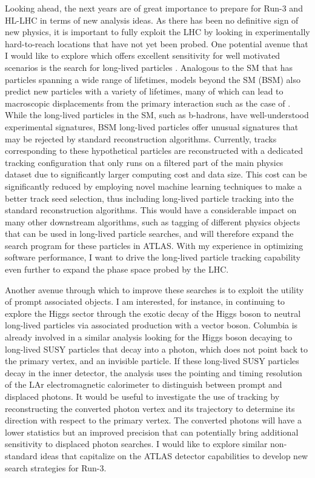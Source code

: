 \documentclass[a4paper]{article}
\begin{document}
\bigskip

Looking ahead, the next years are of great importance to prepare for Run-3 and HL-LHC in terms of new analysis ideas. As there has been no definitive sign of new physics,
it is important to fully exploit the LHC by looking in experimentally hard-to-reach locations that have not yet been probed.
One potential avenue that I would like to explore which offers excellent sensitivity for well motivated scenarios is the search for long-lived particles \cite{alimena2019searching}.
Analogous to the SM that has particles spanning a wide range of lifetimes, models beyond the SM (BSM) also predict new particles
with a variety of lifetimes, many of which can lead to macroscopic displacements from the primary interaction
such as the case of .
While the long-lived particles in the SM, such as b-hadrons, have well-understood experimental signatures, BSM long-lived particles
offer unusual signatures that may be rejected by standard reconstruction algorithms.
Currently, tracks corresponding to these hypothetical particles are reconstructed with a dedicated tracking configuration that only runs
on a filtered part of the main physics dataset due to significantly larger computing cost and data size. This cost can be significantly reduced
by employing novel machine learning techniques to make a better track seed selection, thus including long-lived particle tracking
into the standard reconstruction algorithms. This would have a considerable impact on many other downstream algorithms, such as tagging of different
physics objects that can be used in long-lived particle searches, and will therefore expand the search program for these particles in ATLAS.
With my experience in optimizing software performance, I want to drive the long-lived particle tracking capability even further to expand
the phase space probed by the LHC.

\bigskip

Another avenue through which to improve these searches is to exploit the utility of prompt associated objects.
I am interested, for instance, in continuing to explore the Higgs sector through the exotic decay of the Higgs boson to neutral long-lived particles
via associated production with a vector boson. Columbia is already involved in a similar analysis looking for the Higgs boson
decaying to long-lived SUSY particles that decay into a photon, which does not point back to the primary vertex, and an invisible particle.
If these long-lived SUSY particles decay in the inner detector, the analysis uses the pointing and timing resolution of the LAr electromagnetic calorimeter to distinguish between prompt and displaced photons.
It would be useful to investigate the use of tracking by reconstructing the converted photon vertex and its trajectory to determine
its direction with respect to the primary vertex. The converted photons will have a lower statistics but an improved precision that
can potentially bring additional sensitivity to displaced photon searches.
I would like to explore similar non-standard ideas that capitalize on the ATLAS detector capabilities to develop new search strategies for Run-3.
\end{document}
